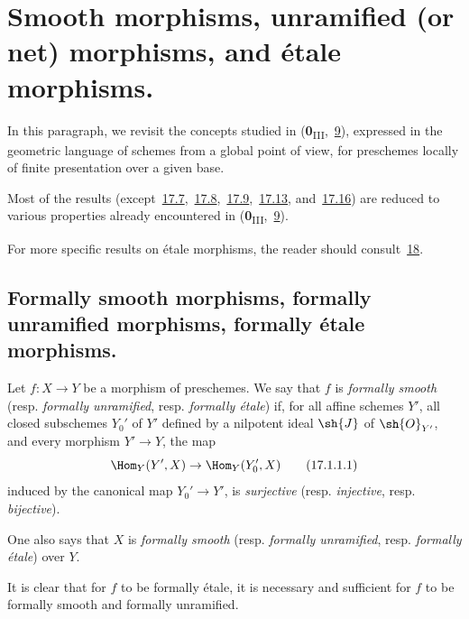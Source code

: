 \section{Smooth morphisms, unramified (or net) morphisms, and \'etale morphisms.}
\label{section:IV.17}

In this paragraph, we revisit the concepts studied in (\textbf{0}\textsubscript{III},~\hyperref[section:0.9]{9}), expressed in the geometric language of schemes from a global point of view, for preschemes locally of finite presentation over a given base.

Most of the results (except~\hyperref[subsection:IV.17.7]{17.7},~\hyperref[subsection:IV.17.8]{17.8},~\hyperref[subsection:IV.17.9]{17.9},~\hyperref[subsection:IV.17.13]{17.13}, and~\hyperref[subsection:IV.17.16]{17.16}) are reduced to various properties already encountered in (\textbf{0}\textsubscript{III},~\hyperref[section:0.9]{9}).

For more specific results on \'etale morphisms, the reader should consult~\textsection\hyperref[section:IV.18]{18}.

\subsection{Formally smooth morphisms, formally unramified morphisms, formally \'etale morphisms.}
\label{subsection:IV.17.1}

\begin{definition}[17.1.1]
\label{IV.17.1.1}
Let $f:X\to Y$ be a morphism of preschemes.
We say that $f$ is \emph{formally smooth} (resp. \emph{formally unramified}, resp. \emph{formally \'etale}) if, for all affine schemes $Y'$, all closed subschemes $Y_0'$ of $Y'$ defined by a nilpotent ideal $\sh{J}$ of $\sh{O}_{Y'}$, and every morphism $Y'\to Y$, the map 
\[
\label{IV.17.1.1.1}
  \Hom_Y(Y',X)\to\Hom_Y(Y_0',X)
  \tag{17.1.1.1}
\]
induced by the canonical map $Y_0'\to Y'$, is \emph{surjective} (resp. \emph{injective}, resp. \emph{bijective}).

One also says that $X$ is \emph{formally smooth} (resp. \emph{formally unramified}, resp. \emph{formally \'etale}) over $Y$.

It is clear that for $f$ to be formally \'etale, it is necessary and sufficient for $f$ to be formally smooth and formally unramified.
\end{definition}


